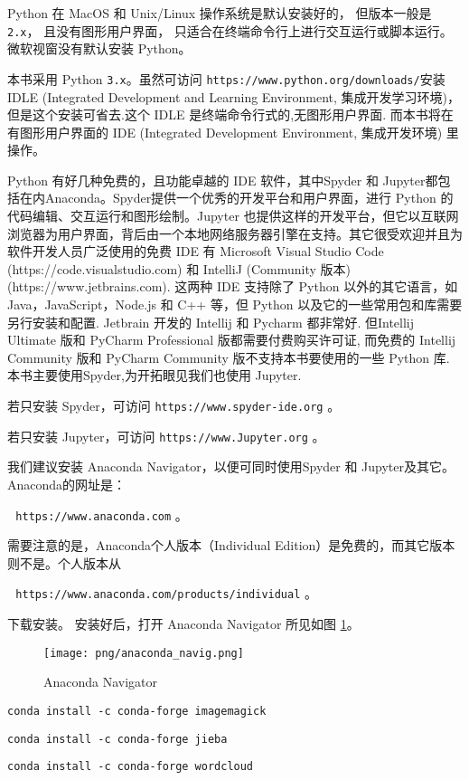 \documentclass[main.tex]{subfiles}
\begin{document}
Python 在 MacOS 和 Unix/Linux 操作系统是默认安装好的，
但版本一般是 \texttt{2.x}，
且没有图形用户界面，
只适合在终端命令行上进行交互运行或脚本运行。
微软视窗没有默认安装 Python。

本书采用 Python \texttt{3.x}。虽然可访问 \texttt{https://www.python.org/downloads/}安装 IDLE (Integrated Development and Learning Environment, 集成开发学习环境)，但是这个安装可省去.这个 IDLE 是终端命令行式的,无图形用户界面.
而本书将在有图形用户界面的 IDE (Integrated Development Environment, 集成开发环境) 里操作。

Python 有好几种免费的，且功能卓越的 IDE 软件，其中Spyder 和 Jupyter都包括在内Anaconda。Spyder提供一个优秀的开发平台和用户界面，进行 Python 的代码编辑、交互运行和图形绘制。Jupyter 也提供这样的开发平台，但它以互联网浏览器为用户界面，背后由一个本地网络服务器引擎在支持。其它很受欢迎并且为软件开发人员广泛使用的免费 IDE 有 Microsoft Visual Studio Code (https://code.visualstudio.com) 和 IntelliJ (Community 版本) (https://www.jetbrains.com).
这两种 IDE 支持除了 Python 以外的其它语言，如 Java，JavaScript，Node.js 和 C++ 等，但 Python 以及它的一些常用包和库需要另行安装和配置. Jetbrain 开发的 Intellij 和 Pycharm 都非常好. 但Intellij Ultimate 版和 PyCharm Professional 版都需要付费购买许可证, 而免费的 Intellij Community 版和 PyCharm Community 版不支持本书要使用的一些 Python 库. 本书主要使用Spyder,为开拓眼见我们也使用 Jupyter.


若只安装 Spyder，可访问
\texttt{https://www.spyder-ide.org} 。

若只安装 Jupyter，可访问
\texttt{https://www.Jupyter.org} 。

我们建议安装 Anaconda Navigator，以便可同时使用Spyder 和 Jupyter及其它。 Anaconda的网址是：

\,\,\,\,\texttt{https://www.anaconda.com} 。

\noindent 需要注意的是，Anaconda个人版本（Individual Edition）是免费的，而其它版本则不是。个人版本从

\,\,\,\,\texttt{https://www.anaconda.com/products/individual} 。

\noindent 下载安装。
安装好后，打开 Anaconda Navigator 所见如图 \ref{fig:2.1.1}。

\begin{figure}[h]
	\texttt{[image: png/anaconda\_navig.png]}
	\caption{Anaconda Navigator}\label{fig:2.1.1}
\end{figure}


\texttt{conda install -c conda-forge imagemagick}

\texttt{conda install -c conda-forge jieba}

\texttt{conda install -c conda-forge wordcloud}
\end{document}
